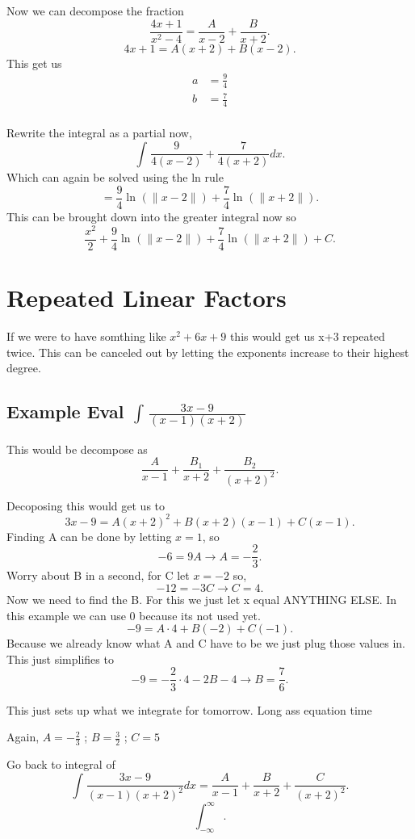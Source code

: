 \documentclass[a4paper]{article}
\begin{document}
Now we can decompose the fraction
\[
\frac{4x+1}{x^2-4}=\frac{A}{x-2}+\frac{B}{x+2}
.\] 
\[
4x+1=A(x+2)+B(x-2)
.\] 
This get us 
\begin{align*}
  a&= \frac{9}{4} \\
  b&= \frac{7}{4} \\
\end{align*}

Rewrite the integral as a partial now,
\[
\int_{}^{} \frac{9}{4(x-2)}+\frac{7}{4(x+2)}dx 
.\] 
Which can again be solved using the ln rule
\[
=\frac{9}{4}\ln^{}(\|x-2\|)+\frac{7}{4}\ln^{}(\|x+2\|)
.\] 
This can be brought down into the greater integral now so
\[
\frac{x^2}{2}+ \frac{9}{4}\ln^{}(\|x-2\|)+\frac{7}{4}\ln^{}(\|x+2\|)+C
.\] 

\section{Repeated Linear Factors}%
\label{sec:Repeated Linear Factors}

If we were to have somthing like $x^2+6x+9$ this would get us x+3 repeated twice. This can be canceled out by letting the exponents increase to their highest degree.
\subsection{Example Eval $\int_{}^{} \frac{3x-9}{(x-1)(x+2)} $}%

This would be decompose as
\[
\frac{A}{x-1}+\frac{B_{1}}{x+2}+\frac{B_{2}}{(x+2)^2}
.\] 
\newpage

Decoposing this would get us to 
\[
3x-9=A(x+2)^2+B(x+2)(x-1)+C(x-1)
.\] 
Finding A can be done by letting $x=1$, so 
\[
-6=9A \to A=-\frac{2}{3}
.\] 
Worry about B in a second, for C let $x=-2$ so,
\[
-12=-3C \to C=4
.\] 
Now we need to find the B. For this we just let x equal ANYTHING ELSE. In this example we can use 0 because its not used yet.
\[
-9=A\cdot 4 + B(-2)+C(-1)
.\] 
Because we already know what A and C have to be we just plug those values in.
This just simplifies to 
\[
-9=-\frac{2}{3}\cdot 4 - 2B- 4 \to B=\frac{7}{6}
.\] 

This just sets up what we integrate for tomorrow. Long ass equation time

Again, $A=-\frac{2}{3}$ ; $B=\frac{3}{2}$ ; $C=5$ 

Go back to integral of
\[
\int_{}^{} \frac{3x-9}{(x-1)(x+2)^2}dx=\frac{A}{x-1}+\frac{B}{x+2}+\frac{C}{(x+2)^2} 
.\] 
\[
\int_{-\infty}^{\infty}  
.\] 
\end{document}
